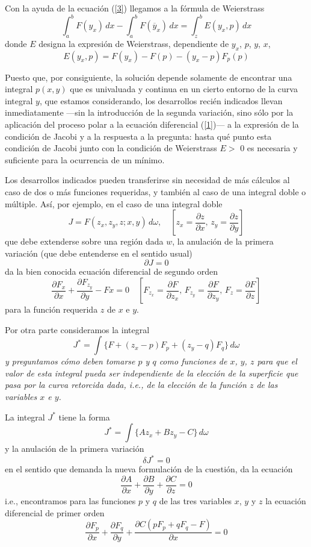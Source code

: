 \documentclass[a4paper, 12pt]{article}
\begin{document}
{Con la ayuda de la ecuación (\ref{3}) llegamos a la fórmula de Weierstrass
\begin{equation}\label{4}
\int_a^b F(y_x) \, dx -\int_a^b F(\overline{y}_x) \, dx = \int_z^b E(y_x,p)\, dx
\end{equation}
donde $E$ designa la expresión de Weierstrass, dependiente de $y_x$, $p$, $y$, $x$, 
$$
E(y_x, p) = F(y_x) - F(p) - (y_x - p) F_p(p)
$$

Puesto que, por consiguiente, la solución depende solamente de encontrar una integral $p(x,y)$ que es univaluada y continua en un cierto entorno de la curva integral $y$, que estamos considerando, los desarrollos recién indicados llevan inmediatamente ---sin la introducción de la segunda variación, sino sólo por la aplicación del proceso polar a la ecuación diferencial (\ref{1})--- a la expresión de la condición de Jacobi y a la respuesta a la pregunta: hasta qué punto esta condición de Jacobi junto con la condición de Weierstrass $E >$ 0 es necesaria y suficiente para la ocurrencia de un mínimo.

Los desarrollos indicados pueden transferirse sin necesidad de más  
cálculos al caso de dos o más funciones requeridas, y también al caso de una integral doble o múltiple. Así, por ejemplo, en el caso de una integral doble
$$
J= F(z_x,z_y,z;x,y) \, d\omega, \quad \left[ z_x = \frac{\partial z}{\partial x}, \, z_y = \frac{\partial z}{\partial y}\right]
$$
que debe extenderse sobre una región dada $w$, la anulación de la primera variación (que debe entenderse en el sentido usual)
$$
\partial J=0
$$
da la bien conocida ecuación diferencial de segundo orden
$$
 \frac{\partial F_x}{\partial x}+ \frac{\partial F_{z_y}}{\partial y}-Fx=0 \quad \left[ F_{z_x}= \frac{\partial F}{\partial  z_x} , \, F_{z_y}= \frac{\partial F}{\partial  z_y} ,\, F_{z}= \frac{\partial F}{\partial  z}\right]
$$
para la función requerida $z$ de $x$ e $y$.

Por otra parte consideramos la integral
$$
J^*=\int\{F+(z_x-p)F_p+(z_y-q)F_q\}\, d\omega
$$
\textit{y preguntamos cómo deben tomarse $p$ y $q$ como funciones de $x$, $y$, $z$ para que el valor de esta integral pueda ser independiente de la elección de la superficie que pasa por la curva retorcida dada, i.e., de la elección de la función $z$ de las variables $x$ e $y$.}

La integral $J^*$ tiene la forma
$$
J^*= \int \{ A z_x+B z_y-C\} \, d\omega
$$
y la anulación de la primera variación 
$$
\delta J^*=0
$$
en el sentido que demanda la nueva formulación de la cuestión, da la ecuación
$$
\frac{\partial A}{\partial x}+\frac{\partial B}{\partial y}+\frac{\partial C}{\partial z}=0
$$
i.e., encontramos para las funciones $p$ y $q$ de las tres variables $x$, $y$ y $z$ la ecuación diferencial de primer orden
\begin{equation}\label{I}
\frac{\partial F_p}{\partial x}+\frac{\partial F_q}{\partial y}+\frac{\partial C(pF_p+qF_q-F)}{\partial x}=0
\end{equation}



}
\end{document}
